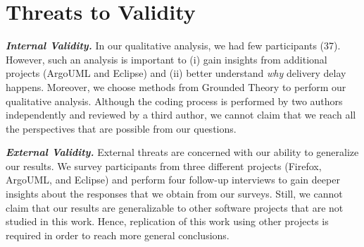 \section{Threats to Validity} \label{ch6:threats}

\textbf{\textit{Internal Validity.}} In our qualitative analysis, we had few
participants (37). However, such an analysis is important to (i) gain insights
from additional projects (ArgoUML and Eclipse) and (ii) better understand {\em
why} delivery delay happens.  Moreover, we choose methods from Grounded Theory
to perform our qualitative analysis. Although the coding process is performed by
two authors independently and reviewed by a third author, we cannot claim that
we reach all the perspectives that are possible from our questions.

\textbf{\textit{External Validity.}} External threats are concerned with our
ability to generalize our results. We survey participants from three different
projects (Firefox, ArgoUML, and Eclipse) and perform four follow-up interviews
to gain deeper insights about the responses that we obtain from our surveys.
Still, we cannot claim that our results are generalizable to other software
projects that are not studied in this work.  Hence, replication of this work
using other projects is required in order to reach more general conclusions.

